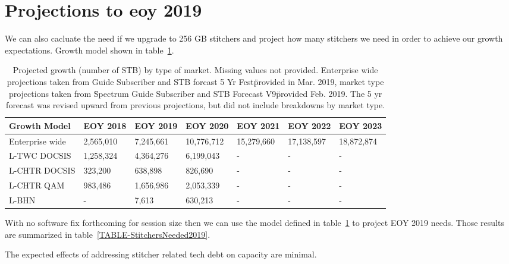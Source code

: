\documentclass{article}
\begin{document}
\section{Projections to eoy 2019}
\label{SECTION-2019Proj}

We can also cacluate the need if we upgrade to 256 GB stitchers and project how many stitchers we need in order to achieve our growth expectations. Growth model shown in table~\ref{TABLE-GrowthModel}. 

\begin{table}[H]
\begin{tabular}{|l|l|l|l|l|l|l|} 
\hline Growth Model & EOY 2018 & EOY 2019 & EOY 2020 & EOY 2021 & EOY 2022 & EOY 2023\\
\hline Enterprise wide & 2,565,010 & 7,245,661 & 10,776,712 & 15,279,660 & 17,138,597 & 18,872,874 \\
\hline L-TWC DOCSIS & 1,258,324 & 4,364,276 & 6,199,043 & - & - & -\\
\hline L-CHTR DOCSIS & 323,200 & 638,898 & 826,690 & - & - & -\\
\hline L-CHTR QAM & 983,486 & 1,656,986 & 2,053,339 & - & - & -\\
\hline L-BHN & - & 7,613 & 630,213 & - & - & -\\
\hline 
\end{tabular}
\caption{\label{TABLE-GrowthModel}Projected growth (number of STB) by type of market. Missing values not provided. Enterprise wide projections taken from \"Guide Subscriber and STB forcast 5 Yr Fcst\" provided in Mar. 2019, market type projections taken from \"Spectrum Guide Subscriber and STB Forecast V9\" provided Feb. 2019. The 5 yr forecast was revised upward from previous projections, but did not include breakdowns by market type.}
\end{table}

With no software fix forthcoming for session size then we can use the model defined in table~\ref{TABLE-GrowthModel} to project EOY 2019 needs. Those results are summarized in table~\ref{TABLE-StitchersNeeded2019}. 

The expected effects of addressing stitcher related tech debt on capacity are minimal. 
\end{document}
